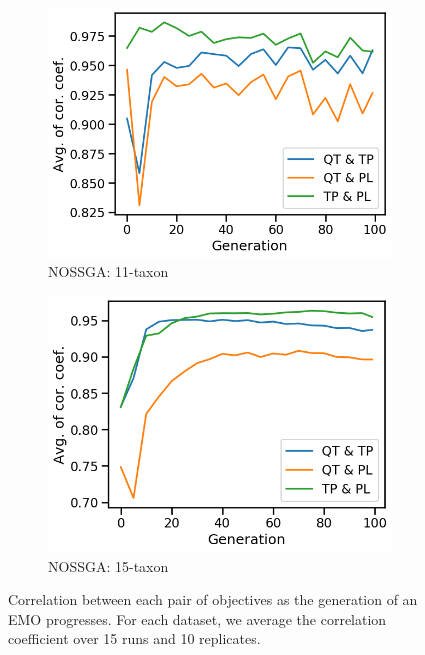 \begin{figure}[!htbp]
\begin{adjustwidth}{-1cm}{-1cm}
\begin{subfigure}[b]{0.4\textwidth}
			\includegraphics[width=\textwidth]{Figure/11-taxon_NOSSGA_corr_plot}
			\caption{NOSSGA: 11-taxon}
		\end{subfigure}%
		\begin{subfigure}[b]{0.4\textwidth}
			\includegraphics[width=\textwidth]{Figure/15-taxon_NOSSGA_corr_plot}
			\caption{NOSSGA: 15-taxon}
		\end{subfigure}
		\caption{Correlation between each pair of objectives as the generation of an EMO progresses. For each dataset, we average the correlation coefficient over 15 runs and 10 replicates.}
		\label{fig:gen_wise_correlation}
	\end{adjustwidth}
\end{figure}


